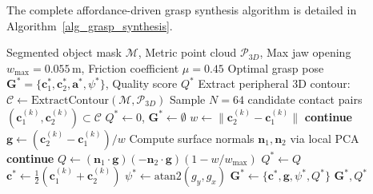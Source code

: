 \documentclass[journal]{IEEEtran}
\begin{document}
The complete affordance-driven grasp synthesis algorithm is detailed in Algorithm~\ref{alg_grasp_synthesis}.

\begin{algorithm}[!t]
\caption{Affordance-Driven Antipodal Grasp Synthesis}
\label{alg_grasp_synthesis}
\begin{algorithmic}[1]
\REQUIRE Segmented object mask $\mathcal{M}$, Metric point cloud $\mathcal{P}_{3D}$, Max jaw opening $w_{\text{max}} = 0.055$\,m, Friction coefficient $\mu = 0.45$
\ENSURE Optimal grasp pose $\mathbf{G}^* = \{\mathbf{c}_1^*, \mathbf{c}_2^*, \mathbf{a}^*, \psi^*\}$, Quality score $Q^*$
\STATE Extract peripheral 3D contour: $\mathcal{C} \leftarrow \text{ExtractContour}(\mathcal{M}, \mathcal{P}_{3D})$
\STATE Sample $N = 64$ candidate contact pairs $(\mathbf{c}_1^{(k)}, \mathbf{c}_2^{(k)}) \subset \mathcal{C}$
\STATE $Q^* \leftarrow 0$, $\mathbf{G}^* \leftarrow \emptyset$
    \STATE $w \leftarrow \|\mathbf{c}_2^{(k)} - \mathbf{c}_1^{(k)}\|$
        \STATE \textbf{continue} 
    \ENDIF
    \STATE $\mathbf{g} \leftarrow (\mathbf{c}_2^{(k)} - \mathbf{c}_1^{(k)}) / w$
    \STATE Compute surface normals $\mathbf{n}_1, \mathbf{n}_2$ via local PCA
        \STATE \textbf{continue} 
    \ENDIF
    \STATE $Q \leftarrow (\mathbf{n}_1 \cdot \mathbf{g})(-\mathbf{n}_2 \cdot \mathbf{g})(1 - w/w_{\text{max}})$
        \STATE $Q^* \leftarrow Q$
        \STATE $\mathbf{c}^* \leftarrow \frac{1}{2}(\mathbf{c}_1^{(k)} + \mathbf{c}_2^{(k)})$
        \STATE $\psi^* \leftarrow \text{atan2}(g_y, g_x)$
        \STATE $\mathbf{G}^* \leftarrow \{\mathbf{c}^*, \mathbf{g}, \psi^*, Q^*\}$
    \ENDIF
\ENDFOR
\RETURN $\mathbf{G}^*, Q^*$
\end{algorithmic}
\end{algorithm}
\end{document}
